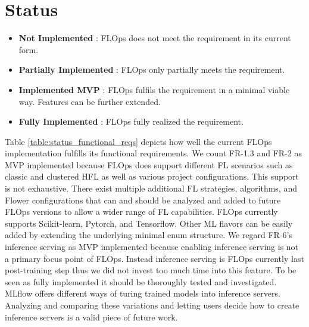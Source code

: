 \section{Status}

\begin{itemize}
    \item [\faCircleO] \textbf{Not Implemented} : FLOps does not meet the requirement in its current form. 
	\item [\faDotCircleO] \textbf{Partially Implemented} : FLOps only partially meets the requirement.
	\item [\faArrowCircleRight] \textbf{Implemented MVP} : FLOps fulfils the requirement in a minimal viable way. Features can be further extended.
	\item [\faCircle] \textbf{Fully Implemented} : FLOps fully realized the requirement.
\end{itemize}



Table \ref{table:status_functional_reqs} depicts how well the current FLOps implementation fulfills its functional requirements.
We count FR-1.3 and FR-2 as MVP implemented because FLOps does support different FL scenarios such as classic and clustered HFL as well as various project configurations.
This support is not exhaustive.
There exist multiple additional FL strategies, algorithms, and Flower configurations that can and should be analyzed and added to future FLOps versions to allow a wider range of FL capabilities.
FLOps currently supports Scikit-learn, Pytorch, and Tensorflow.
Other ML flavors can be easily added by extending the underlying minimal enum structure.
We regard FR-6's inference serving as MVP implemented because enabling inference serving is not a primary focus point of FLOps.
Instead inference serving is FLOps currently last post-training step thus we did not invest too much time into this feature.
To be seen as fully implemented it should be thoroughly tested and investigated.
MLflow offers different ways of turing trained models into inference servers.
Analyzing and comparing these variations and letting users decide how to create inference servers is a valid piece of future work.

